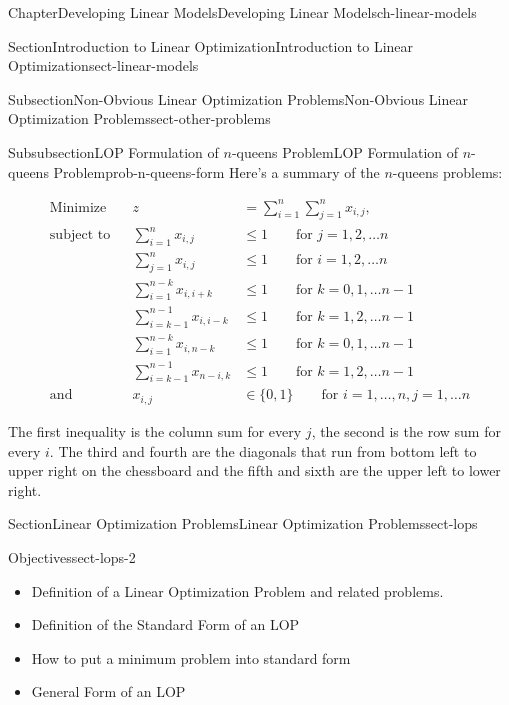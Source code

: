 \documentclass[oneside,10pt,]{book}
\numberwithin{equation}{section}
\newcommand{\amp}{&}
\begin{document}
\begin{chapterptx}{Chapter}{Developing Linear Models}{}{Developing Linear Models}{}{}{ch-linear-models}
\begin{sectionptx}{Section}{Introduction to Linear Optimization}{}{Introduction to Linear Optimization}{}{}{sect-linear-models}
\begin{subsectionptx}{Subsection}{Non-Obvious Linear Optimization Problems}{}{Non-Obvious Linear Optimization Problems}{}{}{sect-other-problems}
\begin{subsubsectionptx}{Subsubsection}{LOP Formulation of \(n\)-queens Problem}{}{LOP Formulation of \(n\)-queens Problem}{}{}{prob-n-queens-form}
Here's a summary of the \(n\)-queens problems:%
\par
%
\begin{equation*}
\begin{aligned} \text{Minimize} \amp \amp z \amp = \sum_{i=1}^n \sum_{j=1}^n x_{i,j}, \\ \text{subject to} \amp \amp \sum_{i=1}^n x_{i,j} \amp \leq 1 \qquad \text{for $j=1, 2, \ldots n$} \\ \amp \amp \sum_{j=1}^n x_{i,j} \amp \leq 1 \qquad \text{for $i=1, 2, \ldots n$} \\ \amp \amp \sum_{i=1}^{n-k} x_{i,i+k} \amp \leq 1 \qquad \text{for $k=0, 1, \ldots n-1$} \\ \amp \amp \sum_{i=k-1}^{n-1} x_{i,i-k} \amp \leq 1 \qquad \text{for $k=1,2, \ldots n-1$} \\ \amp \amp \sum_{i=1}^{n-k} x_{i,n-k} \amp \leq 1 \qquad \text{for $k=0, 1, \ldots n-1$} \\ \amp \amp \sum_{i=k-1}^{n-1} x_{n-i,k} \amp \leq 1 \qquad \text{for $k=1,2, \ldots n-1$} \\ \text{and} \amp \amp x_{i,j} \amp \in \{0,1\} \qquad \text{for $i=1,\ldots, n, j = 1, \ldots n$} \end{aligned}
\end{equation*}
%
\par
The first inequality is the column sum for every \(j\), the second is the row sum for every \(i\). The third and fourth are the diagonals that run from bottom left to upper right on the chessboard and the fifth and sixth are the upper left to lower right.%
\end{subsubsectionptx}
\end{subsectionptx}
\end{sectionptx}
%
%
\typeout{************************************************}
\typeout{************************************************}
%
\begin{sectionptx}{Section}{Linear Optimization Problems}{}{Linear Optimization Problems}{}{}{sect-lops}
\begin{objectives}{Objectives}{sect-lops-2}
%
\begin{itemize}[label=\textbullet]
\item{}Definition of a Linear Optimization Problem and related problems.%
\item{}Definition of the Standard Form of an LOP%
\item{}How to put a minimum problem into standard form%
\item{}General Form of an LOP%

\end{itemize}
\end{objectives}
\end{sectionptx}
\end{chapterptx}
\end{document}
